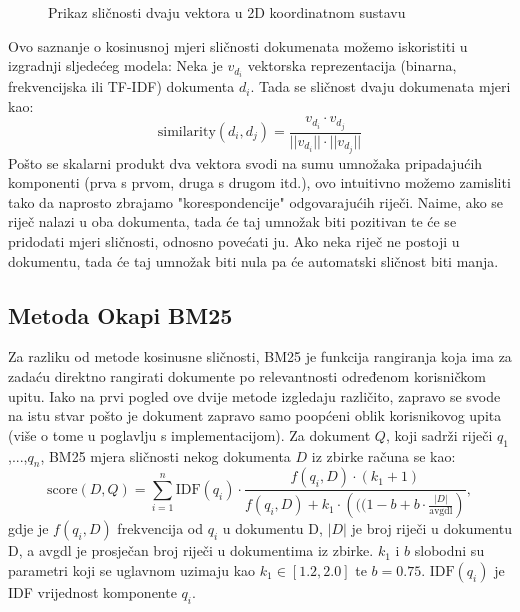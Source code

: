 \documentclass[times, utf8, zavrsni]{fer}
\begin{document}
\begin{figure}
\caption{Prikaz sličnosti dvaju vektora u 2D koordinatnom sustavu}
\end{figure}

Ovo saznanje o kosinusnoj mjeri sličnosti dokumenata možemo iskoristiti u izgradnji sljedećeg modela: Neka je $v_{d_i}$ vektorska reprezentacija (binarna, frekvencijska ili TF-IDF) dokumenta $d_{i}$. Tada se sličnost dvaju dokumenata mjeri kao:
\begin{equation}
{\displaystyle {\text{similarity}}(d_{i}, d_{j})}={\frac{v_{d_i} \cdot v_{d_j}}{||v_{d_i}|| \cdot ||v_{d_j}||}}
\end{equation}
Pošto se skalarni produkt dva vektora svodi na sumu umnožaka pripadajućih komponenti (prva s prvom, druga s drugom itd.), ovo intuitivno možemo zamisliti tako da naprosto zbrajamo "korespondencije" odgovarajućih riječi. Naime, ako se riječ nalazi u oba dokumenta, tada će taj umnožak biti pozitivan te će se pridodati mjeri sličnosti, odnosno povećati ju. Ako neka riječ ne postoji u dokumentu, tada će taj umnožak biti nula pa će automatski sličnost biti manja.

\subsection{Metoda Okapi BM25}
Za razliku od metode kosinusne sličnosti, BM25 je funkcija rangiranja koja ima za zadaću direktno rangirati dokumente po relevantnosti određenom korisničkom upitu. Iako na prvi pogled ove dvije metode izgledaju različito, zapravo se svode na istu stvar pošto je dokument zapravo samo poopćeni oblik korisnikovog upita (više o tome u poglavlju s implementacijom).
Za dokument $Q$, koji sadrži riječi $q_{1}$,...,$q_{n}$, BM25 mjera sličnosti nekog dokumenta $D$ iz zbirke računa se kao:
\begin{equation}
{\displaystyle {\text{score}}(D,Q)=\sum _{i=1}^{n}{\text{IDF}}(q_{i})\cdot {\frac {f(q_{i},D)\cdot (k_{1}+1)}{f(q_{i},D)+k_{1}\cdot \left(((1-b+b\cdot {\frac {|D|}{\text{avgdl}}}\right)}},}
\end{equation}
gdje je ${\displaystyle f(q_{i},D)}$	 frekvencija od ${\displaystyle q_{i}}$ u dokumentu D, ${\displaystyle |D|}$ je broj riječi u dokumentu D, a avgdl je prosječan broj riječi u dokumentima iz zbirke. ${\displaystyle k_{1}}$ i $b$ slobodni su parametri koji se uglavnom uzimaju kao ${\displaystyle k_{1}\in [1.2,2.0]}$ te ${\displaystyle b=0.75}.{\displaystyle {\text{ IDF}}(q_{i})}$ je IDF vrijednost komponente ${\displaystyle q_{i}}$.
\end{document}
